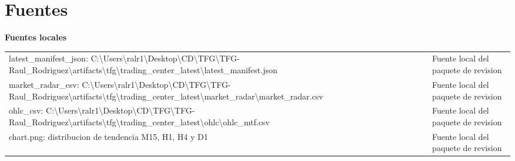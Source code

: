 \documentclass[11pt,a4paper]{article}
\begin{document}
\section*{Fuentes}
\textbf{Fuentes locales}\par
\begin{tabularx}{\textwidth}{p{4.2cm}X}
latest\_manifest\_json: C:\textbackslash{}Users\textbackslash{}ralr1\textbackslash{}Desktop\textbackslash{}CD\textbackslash{}TFG\textbackslash{}TFG-Raul\_Rodriguez\textbackslash{}artifacts\textbackslash{}tfg\textbackslash{}trading\_center\_latest\textbackslash{}latest\_manifest.json & Fuente local del paquete de revision \\
market\_radar\_csv: C:\textbackslash{}Users\textbackslash{}ralr1\textbackslash{}Desktop\textbackslash{}CD\textbackslash{}TFG\textbackslash{}TFG-Raul\_Rodriguez\textbackslash{}artifacts\textbackslash{}tfg\textbackslash{}trading\_center\_latest\textbackslash{}market\_radar\textbackslash{}market\_radar.csv & Fuente local del paquete de revision \\
ohlc\_csv: C:\textbackslash{}Users\textbackslash{}ralr1\textbackslash{}Desktop\textbackslash{}CD\textbackslash{}TFG\textbackslash{}TFG-Raul\_Rodriguez\textbackslash{}artifacts\textbackslash{}tfg\textbackslash{}trading\_center\_latest\textbackslash{}ohlc\textbackslash{}ohlc\_mtf.csv & Fuente local del paquete de revision \\
chart.png: distribucion de tendencia M15, H1, H4 y D1 & Fuente local del paquete de revision \\
\end{tabularx}
\end{document}

